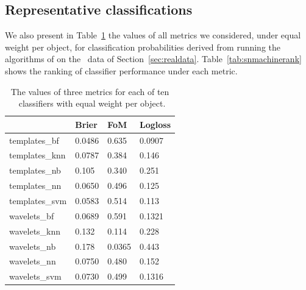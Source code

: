 \subsection{Representative classifications}
\label{sec:realresults}

We also present in Table~\ref{tab:snmachinevals} the values of all metrics we considered, under equal weight per object, for classification probabilities derived from running the algorithms of \citet{lochner_photometric_2016} on the \snphotcc\ data of Section~\ref{sec:realdata}.
Table~\ref{tab:snmachinerank} shows the ranking of classifier performance under each metric.

\begin{table}[]
\begin{tabular}{llll}
& Brier   & FoM   & Logloss            \\
\hline
templates\_bf  						 & 0.0486  & 0.635  & 0.0907  \\
templates\_knn             & 0.0787  & 0.384 & 0.146  \\
templates\_nb              & 0.105  & 0.340  & 0.251 \\
templates\_nn							 & 0.0650  & 0.496   & 0.125 \\
templates\_svm             & 0.0583 & 0.514  & 0.113 \\
wavelets\_bf   						 & 0.0689  & 0.591  & 0.1321 \\
wavelets\_knn              & 0.132  & 0.114 & 0.228 \\
wavelets\_nb               & 0.178  & 0.0365 & 0.443  \\
wavelets\_nn 							 & 0.0750  & 0.480  & 0.152 \\
wavelets\_svm              & 0.0730  & 0.499  & 0.1316 \\
\end{tabular}
\caption{The values of three metrics for each of ten \snmachine\ classifiers with equal weight per object.}
	\label{tab:snmachinevals}
\end{table}

